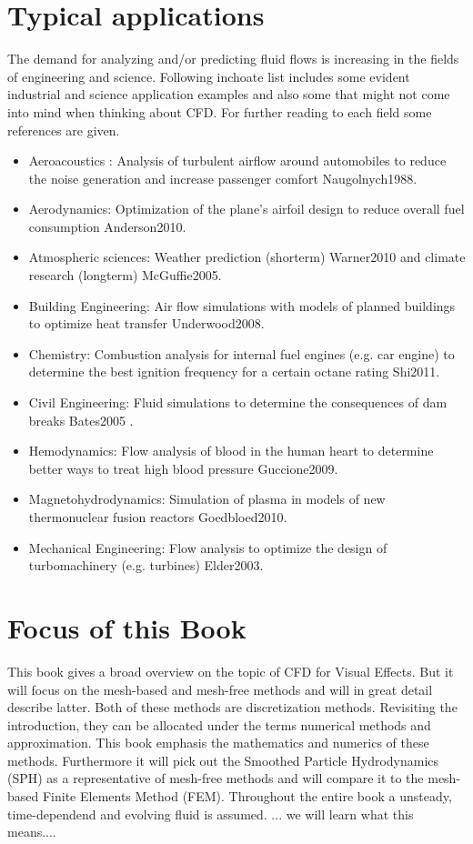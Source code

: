 \section{Typical applications}

The demand for analyzing and/or predicting fluid flows is increasing in the fields of
engineering and science. Following inchoate list includes some evident industrial and science application examples and also some that might not come into mind when thinking about CFD. For further reading to each field some references are given.

\begin{itemize}
\item Aeroacoustics : Analysis of turbulent airflow around automobiles to reduce the noise generation and increase passenger comfort Naugolnych1988.  
\item Aerodynamics: Optimization of the plane's airfoil design to reduce overall fuel consumption Anderson2010.
\item Atmospheric sciences: Weather prediction (shorterm) Warner2010 and climate research (longterm) McGuffie2005.
\item Building Engineering: Air flow simulations with models of planned buildings to optimize heat transfer Underwood2008.
\item Chemistry: Combustion analysis for internal fuel engines (e.g. car engine) to determine the best ignition frequency for a certain octane rating Shi2011.
\item Civil Engineering: Fluid simulations to determine the consequences of dam breaks Bates2005 .
\item Hemodynamics: Flow analysis of blood in the human heart to determine better ways to treat high blood pressure Guccione2009.
\item Magnetohydrodynamics: Simulation of plasma in models of new thermonuclear fusion reactors Goedbloed2010. 
\item Mechanical Engineering: Flow analysis to optimize the design of turbomachinery (e.g. turbines) Elder2003.
\end{itemize}

\section{Focus of this Book}

This book gives a broad overview on the topic of CFD for Visual Effects. But it will focus on the mesh-based and mesh-free methods and will in great detail describe latter. Both of these methods are discretization methods. Revisiting the introduction, they can be allocated under the terms numerical methods and approximation. This book emphasis the mathematics and numerics of these methods. Furthermore it will pick out the Smoothed Particle Hydrodynamics (SPH) as a representative of mesh-free methods and will compare it to the mesh-based Finite Elements Method (FEM). Throughout the entire book a unsteady, time-dependend and evolving fluid is assumed. ... we will learn what this means....


